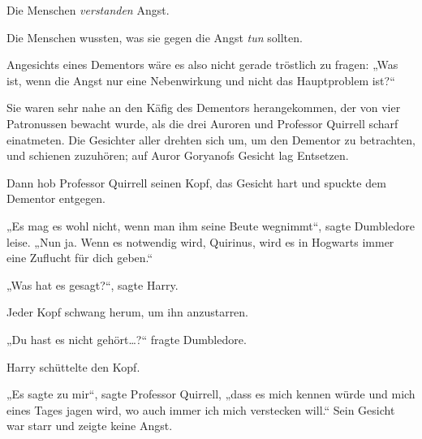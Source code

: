 Die Menschen \emph{verstanden} Angst.

Die Menschen wussten, was sie gegen die Angst \emph{tun} sollten.

Angesichts eines Dementors wäre es also nicht gerade tröstlich zu fragen: „Was ist, wenn die Angst nur eine Nebenwirkung und nicht das Hauptproblem ist?“

Sie waren sehr nahe an den Käfig des Dementors herangekommen, der von vier Patronussen bewacht wurde, als die drei Auroren und Professor Quirrell scharf einatmeten. Die Gesichter aller drehten sich um, um den Dementor zu betrachten, und schienen zuzuhören; auf Auror Goryanofs Gesicht lag Entsetzen.

Dann hob Professor Quirrell seinen Kopf, das Gesicht hart und spuckte dem Dementor entgegen.

„Es mag es wohl nicht, wenn man ihm seine Beute wegnimmt“, sagte Dumbledore leise. „Nun ja. Wenn es notwendig wird, Quirinus, wird es in Hogwarts immer eine Zuflucht für dich geben.“

„Was hat es gesagt?“, sagte Harry.

Jeder Kopf schwang herum, um ihn anzustarren.

„Du hast es nicht gehört…?“ fragte Dumbledore.

Harry schüttelte den Kopf.

„Es sagte zu mir“, sagte Professor Quirrell, „dass es mich kennen würde und mich eines Tages jagen wird, wo auch immer ich mich verstecken will.“ Sein Gesicht war starr und zeigte keine Angst.

